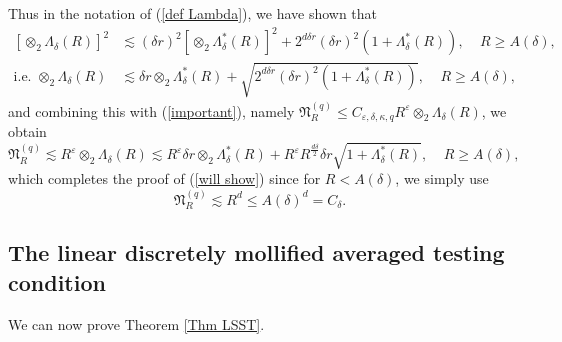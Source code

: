 \documentclass{amsart}%
\theoremstyle{plain}
\numberwithin{equation}{section}
\begin{document}
Thus in the notation of (\ref{def Lambda}), we have shown that%
\begin{align*}
\left[  \otimes_{2}\Lambda_{\delta}\left(  R\right)  \right]  ^{2}  &
\lesssim\left(  \delta r\right)  ^{2}\left[  \otimes_{2}\Lambda_{\delta}%
^{\ast}\left(  R\right)  \right]  ^{2}+2^{d\delta r}\left(  \delta r\right)
^{2}\left(  1+\Lambda_{\delta}^{\ast}\left(  R\right)  \right)
,\ \ \ \ \ R\geq A\left(  \delta\right)  ,\\
\text{i.e. }\otimes_{2}\Lambda_{\delta}\left(  R\right)   & \lesssim\delta
r\otimes_{2}\Lambda_{\delta}^{\ast}\left(  R\right)  +\sqrt{2^{d\delta
r}\left(  \delta r\right)  ^{2}\left(  1+\Lambda_{\delta}^{\ast}\left(
R\right)  \right)  },\ \ \ \ \ R\geq A\left(  \delta\right)  ,
\end{align*}
and combining this with (\ref{important}), namely $\mathfrak{N}_{R}^{\left(
q\right)  }\leq C_{\varepsilon,\delta,\kappa,q}R^{\varepsilon}\otimes
_{2}\Lambda_{\delta}\left(  R\right)  $, we obtain
\begin{equation}
\mathfrak{N}_{R}^{\left(  q\right)  }\lesssim R^{\varepsilon}\otimes
_{2}\Lambda_{\delta}\left(  R\right)  \lesssim R^{\varepsilon}\delta
r\otimes_{2}\Lambda_{\delta}^{\ast}\left(  R\right)  +R^{\varepsilon}%
R^{\frac{d\delta}{2}}\delta r\sqrt{1+\Lambda_{\delta}^{\ast}\left(  R\right)
},\ \ \ \ \ R\geq A\left(  \delta\right)  ,\label{important'}%
\end{equation}
which completes the proof of (\ref{will show}) since for $R<A\left(
\delta\right)  $, we simply use%
\[
\mathfrak{N}_{R}^{\left(  q\right)  }\lesssim R^{d}\leq A\left(
\delta\right)  ^{d}=C_{\delta}\text{.}%
\]


\subsection{The linear discretely mollified averaged testing condition}

We can now prove Theorem \ref{Thm LSST}.
\end{document}
